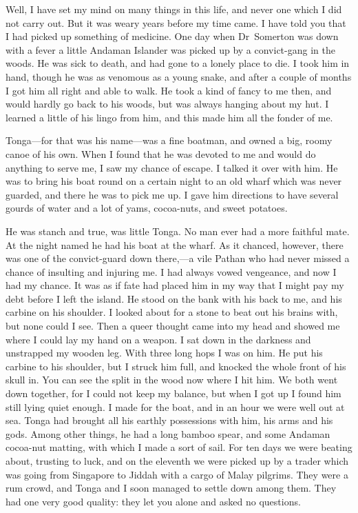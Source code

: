 Well, I have set my mind on many things in this life, and never one which I did not carry out. But it was weary years before my time came. I have told you that I had picked up something of medicine. One day when Dr~Somerton was down with a fever a little Andaman Islander was picked up by a convict-gang in the woods. He was sick to death, and had gone to a lonely place to die. I took him in hand, though he was as venomous as a young snake, and after a couple of months I got him all right and able to walk. He took a kind of fancy to me then, and would hardly go back to his woods, but was always hanging about my hut. I learned a little of his lingo from him, and this made him all the fonder of me.

Tonga—for that was his name—was a fine boatman, and owned a big, roomy canoe of his own. When I found that he was devoted to me and would do anything to serve me, I saw my chance of escape. I talked it over with him. He was to bring his boat round on a certain night to an old wharf which was never guarded, and there he was to pick me up. I gave him directions to have several gourds of water and a lot of yams, cocoa-nuts, and sweet potatoes.

He was stanch and true, was little Tonga. No man ever had a more faithful mate. At the night named he had his boat at the wharf. As it chanced, however, there was one of the convict-guard down there,—a vile Pathan who had never missed a chance of insulting and injuring me. I had always vowed vengeance, and now I had my chance. It was as if fate had placed him in my way that I might pay my debt before I left the island. He stood on the bank with his back to me, and his carbine on his shoulder. I looked about for a stone to beat out his brains with, but none could I see. Then a queer thought came into my head and showed me where I could lay my hand on a weapon. I sat down in the darkness and unstrapped my wooden leg. With three long hops I was on him. He put his carbine to his shoulder, but I struck him full, and knocked the whole front of his skull in. You can see the split in the wood now where I hit him. We both went down together, for I could not keep my balance, but when I got up I found him still lying quiet enough. I made for the boat, and in an hour we were well out at sea. Tonga had brought all his earthly possessions with him, his arms and his gods. Among other things, he had a long bamboo spear, and some Andaman cocoa-nut matting, with which I made a sort of sail. For ten days we were beating about, trusting to luck, and on the eleventh we were picked up by a trader which was going from Singapore to Jiddah with a cargo of Malay pilgrims. They were a rum crowd, and Tonga and I soon managed to settle down among them. They had one very good quality: they let you alone and asked no questions.


